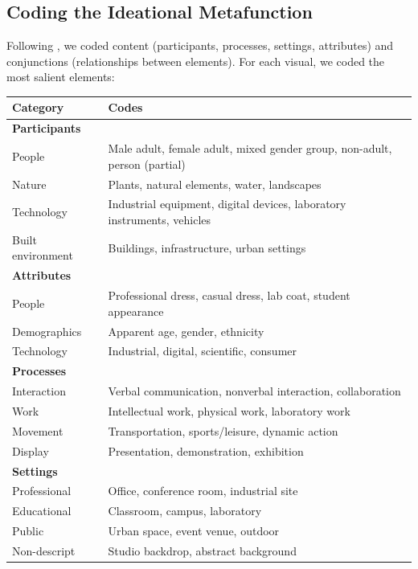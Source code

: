 \documentclass[../main.tex]{subfiles}
\begin{document}
\subsection{Coding the Ideational Metafunction}

Following \textcite{jancsary2018institutions}, we coded content (participants, processes, settings, attributes) and conjunctions (relationships between elements). For each visual, we coded the most salient elements:

\begin{center}
\small
\begin{tabular}{lp{8cm}}
\toprule
\textbf{Category} & \textbf{Codes} \\
\midrule
\textbf{Participants} & \\
\quad People & Male adult, female adult, mixed gender group, non-adult, person (partial) \\
\quad Nature & Plants, natural elements, water, landscapes \\
\quad Technology & Industrial equipment, digital devices, laboratory instruments, vehicles \\
\quad Built environment & Buildings, infrastructure, urban settings \\
\midrule
\textbf{Attributes} & \\
\quad People & Professional dress, casual dress, lab coat, student appearance \\
\quad Demographics & Apparent age, gender, ethnicity \\
\quad Technology & Industrial, digital, scientific, consumer \\
\midrule
\textbf{Processes} & \\
\quad Interaction & Verbal communication, nonverbal interaction, collaboration \\
\quad Work & Intellectual work, physical work, laboratory work \\
\quad Movement & Transportation, sports/leisure, dynamic action \\
\quad Display & Presentation, demonstration, exhibition \\
\midrule
\textbf{Settings} & \\
\quad Professional & Office, conference room, industrial site \\
\quad Educational & Classroom, campus, laboratory \\
\quad Public & Urban space, event venue, outdoor \\
\quad Non-descript & Studio backdrop, abstract background \\
\bottomrule
\end{tabular}
\end{center}
\end{document}
